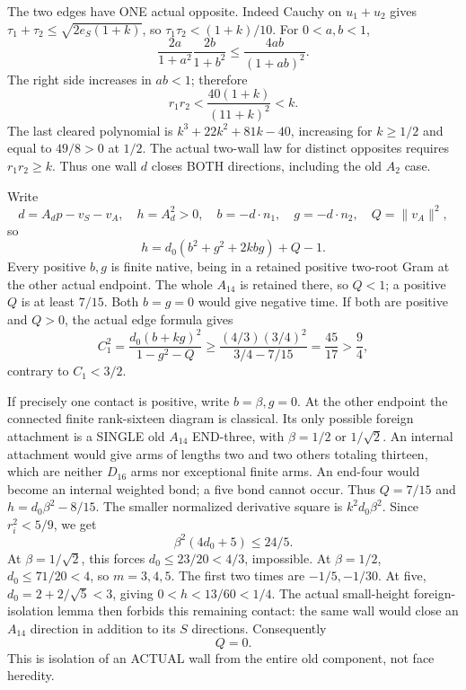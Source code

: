 \documentclass[11pt]{article}
\begin{document}
The two edges have ONE actual opposite.
Indeed Cauchy on \(u_1+u_2\) gives
\(\tau_1+\tau_2\le\sqrt{2e_S(1+k)}\),
so \(\tau_1\tau_2<(1+k)/10\).
For \(0<a,b<1\),
\[
 {\frac{2a}{1+a^2}}{\frac{2b}{1+b^2}}
          \le {\frac{4ab}{(1+ab)^2}}.
\]
The right side increases in \(ab<1\);
therefore
\[
                         r_1r_2<{\frac{40(1+k)}{(11+k)^2}}<k .
\]
The last cleared polynomial is
\(k^3+22k^2+81k-40\), increasing for
\(k\ge1/2\) and equal to \(49/8>0\)
at \(1/2\).
The actual two-wall law for distinct
opposites requires \(r_1r_2\ge k\).
Thus one wall \(d\) closes BOTH directions,
including the old \(A_2\) case.

Write
\[
 d=A_dp-v_S-v_A,\quad h=A_d^2>0,\quad
 b=-d\cdot n_1,\quad g=-d\cdot n_2,\quad Q=\|v_A\|^2,
\]
so
\[
             h=d_0(b^2+g^2+2kbg)+Q-1 .
\]
Every positive \(b,g\) is finite native,
being in a retained positive two-root Gram
at the other actual endpoint.
The whole \(A_{14}\) is retained there,
so \(Q<1\); a positive \(Q\) is at least
\(7/15\).
Both \(b=g=0\) would give negative time.
If both are positive and \(Q>0\), the
actual edge formula gives
\[
 C_1^2={\frac{d_0(b+kg)^2}{1-g^2-Q}}
       \ge{\frac{(4/3)(3/4)^2}{3/4-7/15}}
       ={\frac{45}{17}}>{\frac{9}{4}},
\]
contrary to \(C_1<3/2\).

If precisely one contact is positive,
write \(b=\beta,g=0\).
At the other endpoint the connected finite
rank-sixteen diagram is classical.
Its only possible foreign attachment is
a SINGLE old \(A_{14}\) END-three, with
\(\beta=1/2\) or \(1/\sqrt2\).
An internal attachment would give arms
of lengths two and two others totaling
thirteen, which are neither \(D_{16}\)
arms nor exceptional finite arms.
An end-four would become an internal
weighted bond; a five bond cannot occur.
Thus \(Q=7/15\) and
\(h=d_0\beta^2-8/15\).
The smaller normalized derivative square is
\(k^2d_0\beta^2\).
Since \(r_i^2<5/9\), we get
\[
                          \beta^2(4d_0+5)\le24/5 .
\]
At \(\beta=1/\sqrt2\), this forces
\(d_0\le23/20<4/3\), impossible.
At \(\beta=1/2\), \(d_0\le71/20<4\),
so \(m=3,4,5\).
The first two times are \(-1/5,-1/30\).
At five, \(d_0=2+2/\sqrt5<3\), giving
\(0<h<13/60<1/4\).
The actual small-height foreign-isolation
lemma then forbids this remaining contact:
the same wall would close an \(A_{14}\)
direction in addition to its \(S\) directions.
Consequently
\[
                         Q=0 .
\tag{A14coreiso}\label{eq:arithA14spectatorisolated}
\]
This is isolation of an ACTUAL wall from
the entire old component, not face heredity.
\end{document}
